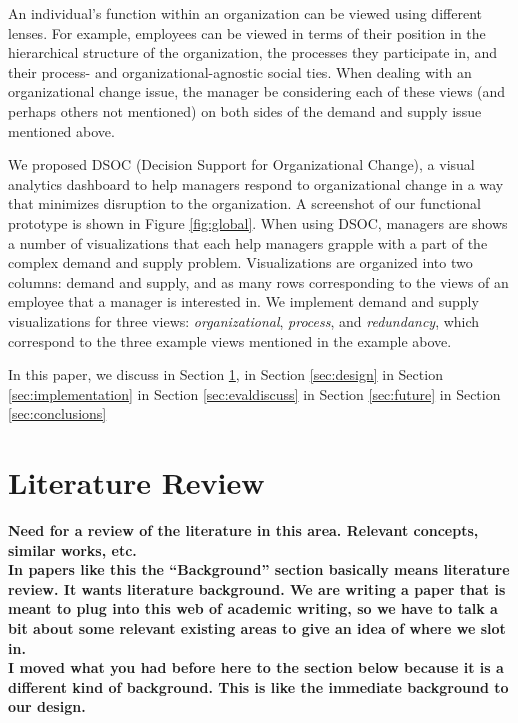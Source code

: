 \message{ !name(FinalPaper.tex)}\documentclass[journal]{vgtc}                %
\begin{document}
An individual's function within an organization can be viewed using different lenses. For example, employees can be viewed in terms of their position in the hierarchical structure of the organization, the processes they participate in, and their process- and organizational-agnostic social ties. When dealing with an organizational change issue, the manager be considering each of these views (and perhaps others not mentioned) on both sides of the demand and supply issue mentioned above.

We proposed DSOC (Decision Support for Organizational Change), a visual analytics dashboard to help managers respond to organizational change in a way that minimizes disruption to the organization. A screenshot of our functional prototype is shown in Figure \ref{fig:global}. When using DSOC, managers are shows a number of visualizations that each help managers grapple with a part of the complex demand and supply problem. Visualizations are organized into two columns: demand and supply, and as many rows corresponding to the views of an employee that a manager is interested in. We implement demand and supply visualizations for three views: \emph{organizational}, \emph{process}, and \emph{redundancy}, which correspond to the three example views mentioned in the example above. 

In this paper, we discuss \textellipsis in Section \ref{sec:background}, \textellipsis in Section \ref{sec:design} \textellipsis in Section \ref{sec:implementation} \textellipsis in Section \ref{sec:evaldiscuss} \textellipsis in Section \ref{sec:future} \textellipsis in Section \ref{sec:conclusions}


\section{Literature Review}
\label{sec:background}

\textbf{{\color{Plum}Need for a review of the literature in this area. Relevant concepts, similar works, etc.\\
    In papers like this the ``Background'' section basically means literature review. It wants literature background. We are writing a paper that is meant to plug into this web of academic writing, so we have to talk a bit about some relevant existing areas to give an idea of where we slot in. \\
    I moved what you had before here to the section below because it is a different kind of background. This is like the immediate background to our design. 
}}
\end{document}
